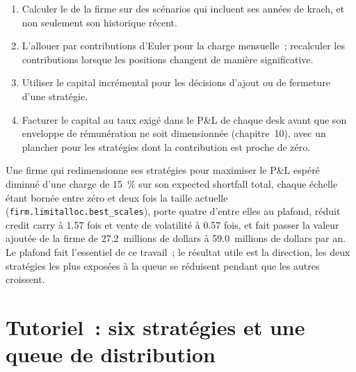 \begin{method}\label{met:fm:limits-and-capital-allocation:charge}
\begin{enumerate}
\item Calculer le  de la firme sur des scénarios qui incluent ses années de krach, et non seulement son historique récent.
\item L'allouer par contributions d'Euler pour la charge mensuelle~; recalculer les contributions lorsque les positions changent de manière significative.
\item Utiliser le capital incrémental pour les décisions d'ajout ou de fermeture d'une stratégie.
\item Facturer le capital au taux exigé dans le P\&L de chaque desk avant que son enveloppe de rémunération ne soit dimensionnée (chapitre~10), avec un plancher pour les stratégies dont
la contribution est proche de zéro.
\end{enumerate}
\end{method}

Une firme qui redimensionne ses stratégies pour maximiser le P\&L espéré diminué d'une charge de 15~\% sur son expected shortfall total, chaque échelle étant bornée entre zéro et
deux fois la taille actuelle (\texttt{firm.limitalloc.best\_scales}), porte quatre d'entre elles au plafond, réduit credit carry à 1.57 fois et vente de volatilité à
0.57 fois, et fait passer la valeur ajoutée de la firme de 27.2~millions de dollars à 59.0~millions de dollars par an. Le plafond fait l'essentiel de ce travail~; le résultat utile est
la direction, les deux stratégies les plus exposées à la queue se réduisent pendant que les autres croissent.

\section{Tutoriel~: six stratégies et une queue de distribution}\label{tut:fm:limits-and-capital-allocation:tut}

